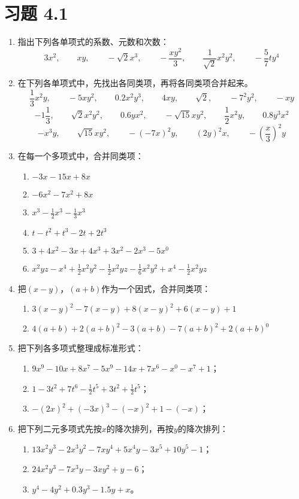 \section*{习题 4.1}
\begin{enumerate}
    \item 指出下列各单项式的系数、元数和次数：
    \[3x^2,\qquad xy,\qquad -\sqrt{2}x^3,\qquad -\frac{xy^2}{3},\qquad \frac{1}{\sqrt{2}}x^2y^2,\qquad -\frac{5}{7}ty^4 \]
\item  在下列各单项式中，先找出各同类项，再将各同类项合并起来。
\[\frac{1}{3}x^2y,\qquad  -5xy^2,\qquad 0.2x^2y^3,\qquad  4xy,\qquad \sqrt{2},\qquad  -7^2y^2,\qquad  -xy\]
\[-1\frac{1}{3},\qquad  \sqrt{2}x^2y^2,\qquad  0.6yx^2,\qquad  -\sqrt{15}xy^2,\qquad  \frac{1}{2}x^2y,\qquad  0.8y^3x^2\]
\[-x^3y,\qquad \sqrt{15}xy^2,\qquad  -(-7x)^2 y,\qquad  (2y)^2x,\qquad -\left(\frac{x}{3}\right)^2y\]
\item  在每一个多项式中，合并同类项：
\begin{enumerate}
    \item $-3x-15x+8x$
    \item $-6x^2-7x^2+8x$
    \item $x^3-\frac{1}{2}x^3-\frac{1}{3}x^3$
    \item $t-t^2+t^3-2t+2t^3$
    \item $3+4x^2-3x+4x^3+3x^2-2x^3-5x^0$
    \item $x^2yz-x^4+\frac{1}{2}x^2y^2-\frac{1}{2}x^2yz-\frac{1}{6}x^2y^2+x^4-\frac{1}{2}x^2yz$
\end{enumerate}

\item 把$(x-y)$，$(a+b)$作为一个因式，合并同类项：
\begin{enumerate}
    \item $3(x-y)^2-7(x-y)+8(x-y)^2+6(x-y)+1$
    \item $4(a+b)+2(a+b)^2-3(a+b)-7(a+b)^2+2(a+b)^0$
\end{enumerate}

\item 把下列各多项式整理成标准形式：
\begin{enumerate}
    \item $9x^9-10x+8x^7-5x^9-14x+7x^6-x^0-x^7+1$；
    \item $1-3t^2+7t^6-\frac{1}{2}t^5+3t^2+\frac{1}{2}t^5$；
    \item $-(2x)^2+(-3x)^3-(-x)^2+1-(-x)$；
\end{enumerate}

\item 把下列二元多项式先按$x$的降次排列，再按$y$的降次排列：
\begin{enumerate}
    \item $13x^2y^3-2x^3y^2-7xy^4+5x^4y-3x^5+10y^5-1$；
    \item $24x^2y^3-7x^3y-3xy^2+y-6$；
    \item $y^4-4y^2+0.3y^3-1.5y+x$。
\end{enumerate}



\end{enumerate}
